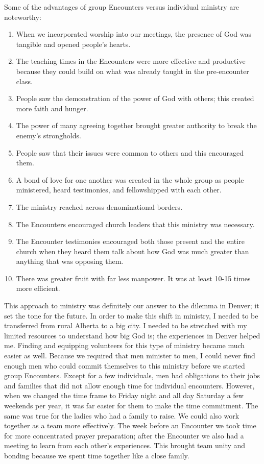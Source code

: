 \documentclass[oneside]{book}
\begin{document}
Some of the advantages of  group Encounters versus individual ministry are noteworthy:
\begin{enumerate}
	\item When we incorporated worship into our meetings, the presence of God was tangible and opened people's hearts.
	\item The teaching times in the Encounters were more effective and productive because they could build on what was already taught in the pre-encounter class.
	\item People saw the demonstration of the power of God with others; this created more faith and hunger.
	\item The power of many agreeing together brought greater authority to break the enemy's strongholds.
	\item People saw that their issues were common to others and this encouraged them.
	\item A bond of love for one another was created in the whole group as people ministered, heard testimonies, and fellowshipped with each other.
	\item The ministry reached across denominational borders. 
	\item The Encounters encouraged church leaders that this ministry was necessary.
	\item The Encounter testimonies encouraged both those present and the entire church when they heard them talk about how God was much greater than anything that was opposing them.
	\item There was greater fruit with far less manpower. It was at least 10-15 times more efficient.
\end{enumerate}

This approach to ministry was definitely our answer to the dilemma in Denver; it set the tone for the future. In order to make this shift in ministry, I needed to be transferred from rural Alberta to a big city. I needed to be stretched with my limited resources to understand how big God is; the experiences in Denver helped me. Finding and equipping volunteers for this type of ministry became much easier as well. Because we required that men minister to men, I could never find enough men who could commit themselves to this ministry before we started group Encounters. Except for a few individuals, men had obligations to their jobs and families that did not allow enough time for individual encounters. However, when we changed the time frame to Friday night and all day Saturday a few weekends per year, it was far easier for them to make the time commitment. The same was true for the ladies who had a family to raise. We could also work together as a team more effectively. The week before an Encounter we took time for more concentrated prayer preparation; after the Encounter we also had a meeting to learn from each other's experiences. This brought team unity and bonding because we spent time together like a close family. 
\end{document}
